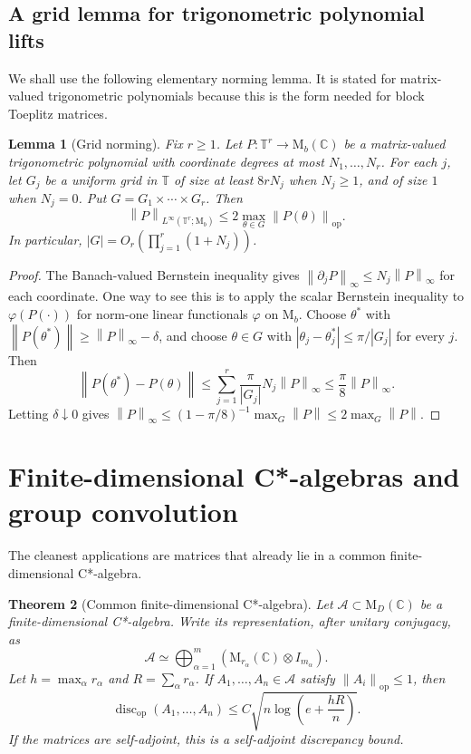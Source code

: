 \documentclass[11pt]{amsart}
\numberwithin{equation}{section}
\newtheorem{theorem}{Theorem}[section]
\newtheorem{lemma}[theorem]{Lemma}
\theoremstyle{definition}
\theoremstyle{remark}
\newcommand{\C}{\mathbb C}
\newcommand{\T}{\mathbb T}
\newcommand{\M}{\mathrm M}
\newcommand{\op}{\mathrm{op}}
\newcommand{\discop}{\operatorname{disc}_{\op}}
\newcommand{\norm}[1]{\left\lVert #1\right\rVert}
\newcommand{\mcA}{\mathcal A}
\begin{document}
\subsection{A grid lemma for trigonometric polynomial lifts}

We shall use the following elementary norming lemma. It is stated for
matrix-valued trigonometric polynomials because this is the form needed for
block Toeplitz matrices.

\begin{lemma}[Grid norming]\label{lem:grid}
Fix $r\ge 1$. Let $P:\T^r\to\M_b(\C)$ be a matrix-valued trigonometric
polynomial with coordinate degrees at most $N_1,\ldots,N_r$. For each $j$, let
$G_j$ be a uniform grid in $\T$ of size at least $8rN_j$ when $N_j\ge 1$, and of
size $1$ when $N_j=0$. Put $G=G_1\times\cdots\times G_r$. Then
\[
\norm{P}_{L^\infty(\T^r;\M_b)}
\le 2\max_{\theta\in G}\norm{P(\theta)}_{\op} .
\]
In particular, $|G|=O_r(\prod_{j=1}^r(1+N_j))$.
\end{lemma}

\begin{proof}
The Banach-valued Bernstein inequality gives
$\norm{\partial_j P}_\infty\le N_j\norm{P}_\infty$ for each coordinate. One way
to see this is to apply the scalar Bernstein inequality to $\varphi(P(\cdot))$
for norm-one linear functionals $\varphi$ on $\M_b$. Choose $\theta^*$ with
$\norm{P(\theta^*)}\ge\norm{P}_\infty-\delta$, and choose $\theta\in G$ with
$|\theta_j-\theta^*_j|\le \pi/|G_j|$ for every $j$. Then
\[
\norm{P(\theta^*)-P(\theta)}
\le \sum_{j=1}^r \frac{\pi}{|G_j|}N_j\norm{P}_\infty
\le \frac{\pi}{8}\norm{P}_\infty .
\]
Letting $\delta\downarrow 0$ gives
$\norm{P}_\infty\le (1-\pi/8)^{-1}\max_G\norm{P}\le 2\max_G\norm{P}$.
\end{proof}

\section{Finite-dimensional C*-algebras and group convolution}

The cleanest applications are matrices that already lie in a common
finite-dimensional C*-algebra.

\begin{theorem}[Common finite-dimensional C*-algebra]\label{thm:cstar}
Let $\mcA\subset\M_D(\C)$ be a finite-dimensional C*-algebra. Write its
representation, after unitary conjugacy, as
\[
\mcA\simeq \bigoplus_{\alpha=1}^m
\left(\M_{r_\alpha}(\C)\otimes I_{m_\alpha}\right).
\]
Let $h=\max_\alpha r_\alpha$ and $R=\sum_\alpha r_\alpha$. If
$A_1,\ldots,A_n\in\mcA$ satisfy $\norm{A_i}_{\op}\le 1$, then
\[
\discop(A_1,\ldots,A_n)
\le C\sqrt{n\log\left(e+\frac{hR}{n}\right)} .
\]
If the matrices are self-adjoint, this is a self-adjoint discrepancy bound.
\end{theorem}
\end{document}
